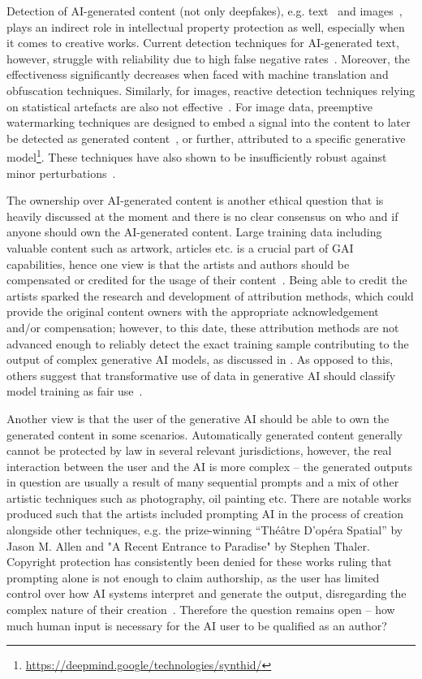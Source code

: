 \documentclass[conference,table]{IEEEtran}
\begin{document}
Detection of AI-generated content (not only deepfakes), e.g. text~\cite{tang_science_2024} and images~\cite{liu_detecting_2022}, plays an indirect role in intellectual property protection as well, especially when it comes to creative works. 
Current detection techniques for AI-generated text, however, struggle with reliability due to high false negative rates~\cite{sadasivan_can_2024,weber-wulff_testing_2023}. 
Moreover, the effectiveness significantly decreases when faced with machine translation and obfuscation techniques.
Similarly, for images, reactive detection techniques relying on statistical artefacts are also not effective~\cite{corvi_detection_2023}.
For image data, preemptive watermarking techniques are designed to embed a signal into the content to later be detected as generated content~\cite{zhu_hidden_2018,zhang_udh_2020}, or further, attributed to a specific generative model\footnote{\url{https://deepmind.google/technologies/synthid/}}.
These techniques have also shown to be insufficiently robust against minor perturbations~\cite{jiang_evading_2023}.

The ownership over AI-generated content is another ethical question that is heavily discussed at the moment and there is no clear consensus on who and if anyone should own the AI-generated content. 
Large training data including valuable content such as artwork, articles etc. is a crucial part of GAI capabilities, hence one view is that the artists and authors should be compensated or credited for the usage of their content~\cite{lnu_artists_2023}. 
Being able to credit the artists sparked the research and development of attribution methods, which could provide the original content owners with the appropriate acknowledgement and/or compensation; however, to this date, these attribution methods are not advanced enough to reliably detect the exact training sample contributing to the output of complex generative AI models, as discussed in . 
As opposed to this, others suggest that transformative use of data in generative AI should classify model training as fair use~\cite{lemley_fair_2021}.   

Another view is that the user of the generative AI should be able to own the generated content in some scenarios. Automatically generated content generally cannot be protected by law in several relevant jurisdictions, however, the real interaction between the user and the AI is more complex -- the generated outputs in question are usually a result of many sequential prompts and a mix of other artistic techniques such as photography, oil painting etc. 
There are notable works produced such that the artists included prompting AI in the process of creation alongside other techniques, e.g. the prize-winning “Théâtre D’opéra Spatial” by Jason M. Allen and "A Recent Entrance to Paradise" by Stephen Thaler.
Copyright protection has consistently been denied for these works ruling that prompting alone is not enough to claim authorship, as the user has limited control over how AI systems interpret and generate the output, disregarding the complex nature of their creation~\cite{roose_ai-generated_2022,brodkin_us_2023}.
Therefore the question remains open -- how much human input is necessary for the AI user to be qualified as an author?
\end{document}
